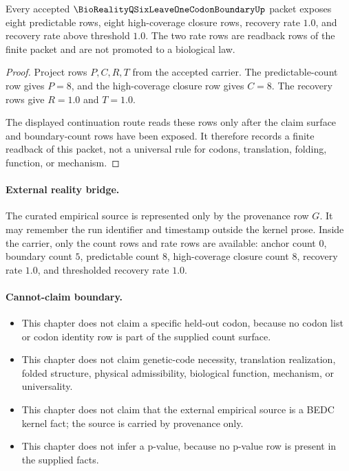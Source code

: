 \begin{theorem}\label{thm:bioreality-q-six-leave-one-codon-boundary-recovery-readback}
Every accepted $\BioRealityQSixLeaveOneCodonBoundaryUp$ packet exposes eight predictable rows, eight high-coverage closure rows, recovery rate $1.0$, and recovery rate above threshold $1.0$. The two rate rows are readback rows of the finite packet and are not promoted to a biological law.
\end{theorem}
\begin{proof}
Project rows $P,C,R,T$ from the accepted carrier. The predictable-count row gives $P=8$, and the high-coverage closure row gives $C=8$. The recovery rows give $R=1.0$ and $T=1.0$.

The displayed continuation route reads these rows only after the claim surface and boundary-count rows have been exposed. It therefore records a finite readback of this packet, not a universal rule for codons, translation, folding, function, or mechanism.
\end{proof}

\paragraph{External reality bridge.} The curated empirical source is represented only by the provenance row $G$. It may remember the run identifier and timestamp outside the kernel prose. Inside the carrier, only the count rows and rate rows are available: anchor count $0$, boundary count $5$, predictable count $8$, high-coverage closure count $8$, recovery rate $1.0$, and thresholded recovery rate $1.0$.

\paragraph{Cannot-claim boundary.}
\begin{itemize}
  \item This chapter does not claim a specific held-out codon, because no codon list or codon identity row is part of the supplied count surface.
  \item This chapter does not claim genetic-code necessity, translation realization, folded structure, physical admissibility, biological function, mechanism, or universality.
  \item This chapter does not claim that the external empirical source is a BEDC kernel fact; the source is carried by provenance only.
  \item This chapter does not infer a p-value, because no p-value row is present in the supplied facts.
\end{itemize}

